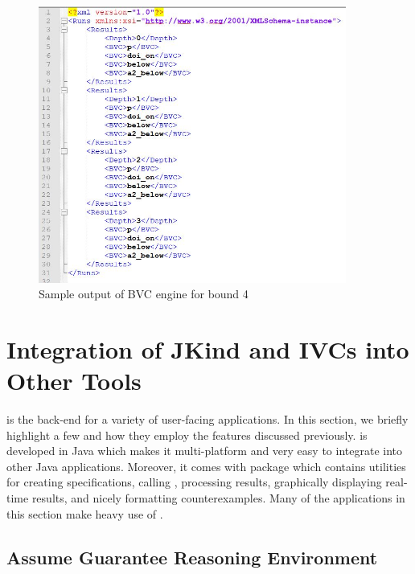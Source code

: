 \begin{figure}
  \centering
  \includegraphics[width=0.9\textwidth]{figs/bvcout.jpg}
  \caption{Sample output of BVC engine for bound 4}
  \label{fig:bvcout}
\end{figure}

\section{ Integration of {\sc JKind} and IVCs into Other Tools}


\jkind is the back-end for a variety of user-facing applications. In this section, we briefly highlight a few and how they employ the features discussed previously.
%
\jkind  is developed in Java which makes it multi-platform and very easy to
integrate into other Java applications. Moreover, it comes with
\jkindapi package which contains utilities for creating \lustre
specifications, calling \jkind, processing \jkind results, graphically
displaying real-time results, and nicely formatting counterexamples.
Many of the applications in this section make heavy use of \jkindapi.
%
\subsection{Assume Guarantee Reasoning Environment}

